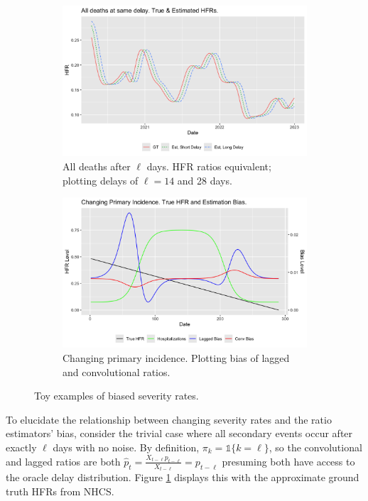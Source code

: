 \documentclass{article}
\begin{document}
\begin{figure}
     \centering
     \begin{subfigure}[b]{0.45\linewidth}
         \centering
         \includegraphics[width=\linewidth]{Figs/sim_onehot.png}
         \caption{All deaths after $\ell$ days. HFR ratios equivalent; plotting delays of $\ell=14$ and 28 days.}
         \label{fig:onehot}
     \end{subfigure}
     \hfill
     \begin{subfigure}[b]{0.45\linewidth}
         \centering
         \includegraphics[width=\linewidth]{Figs/sim_chging_primary.png}
         \caption{Changing primary incidence. Plotting bias of lagged and convolutional ratios.}
         \label{fig:chging_primary}
     \end{subfigure}
        \caption{Toy examples of biased severity rates.}
        \label{fig:bias_ex}
\end{figure}


To elucidate the relationship between changing severity rates and the ratio estimators' bias, consider the trivial case where all secondary events occur after exactly $\ell$ days with no noise. By definition, $\pi_k = \mathds{1}\{k=\ell\}$, so the convolutional and lagged ratios are both $\hat{p}_t = \frac{X_{t-\ell}p_{t-\ell}}{X_{t-\ell}} = p_{t-\ell}$ presuming both have access to the oracle delay distribution. Figure \ref{fig:onehot} displays this with the approximate ground truth HFRs from NHCS. 
\end{document}
